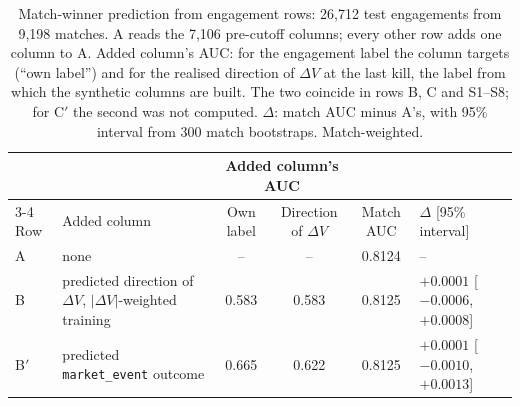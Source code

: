 \begin{table}[!t]
\centering
\caption{Match-winner prediction from engagement rows: 26,712 test engagements from 9,198 matches.
A reads the 7,106 pre-cutoff columns; every other row adds one column to A. Added column's AUC: for the
engagement label the column targets (``own label'') and for the realised direction of $\Delta V$ at the
last kill, the label from which the synthetic columns are built. The two coincide in rows B, C and
S1--S8; for C$'$ the second was not computed.
$\Delta$: match AUC minus A's, with 95\% interval from 300 match bootstraps. Match-weighted.}
\label{tab:limit-stacking}
\footnotesize
\begin{tabular}{@{}llcccl@{}}
\toprule
 & & \multicolumn{2}{c}{Added column's AUC} & & \\
\cmidrule(lr){3-4}
Row & Added column & Own label & Direction of $\Delta V$ & Match AUC & $\Delta$ [95\% interval] \\
\midrule
A & none & -- & -- & 0.8124 & -- \\
B & predicted direction of $\Delta V$, $|\Delta V|$-weighted training & 0.583 & 0.583 & 0.8125 & $+0.0001$ [$-0.0006$, $+0.0008$] \\
B$'$ & predicted \texttt{market\_event} outcome & 0.665 & 0.622 & 0.8125 & $+0.0001$ [$-0.0010$, $+0.0013$] \\

\end{tabular}
\end{table}
